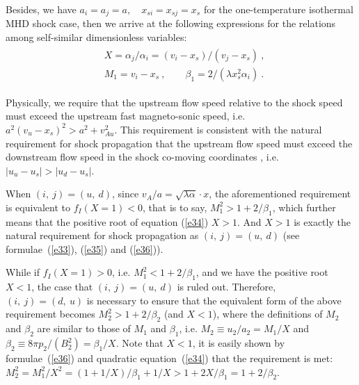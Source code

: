 \documentclass[fleqn,usenatbib]{mnras}
\begin{document}
Besides, we have $a_{i}=a_{j}=a, \quad x_{si}=x_{sj}=x_{s}$ for the one-temperature isothermal MHD shock case, then we arrive at the following expressions for the relations among self-similar dimensionless variables:
\begin{gather}
\begin{split}
&X=\alpha_{j}/\alpha_{i}=(v_{i}-x_{s})/(v_{j}-x_{s})\ ,\\
&M_{1}=v_{i}-x_{s}\ , \qquad \beta_{1}
 =2/(\lambda x^{2}_{s}\alpha_{i})\ .
\end{split}\label{e36}
\end{gather}

Physically, we require that the upstream flow speed relative to the shock speed must exceed the upstream fast magneto-sonic speed, i.e. $a^{2}(v_{u}-x_{s})^{2}>a^{2}+v^{2}_{Au}$. This requirement is consistent with the natural requirement for shock propagation that the upstream flow speed must exceed the downstream flow speed in the shock co-moving coordinates \citep{FM}, i.e. $|u_{u}-u_{s}|>|u_{d}-u_{s}|$.


When $(i,\ j)=(u,\ d)$, since $v_{A}/a=\sqrt{\lambda\alpha}\cdot x$, the aforementioned requirement is equivalent to $f_{I}(X=1)<0$, that is to say, $M_{1}^{2}>1+2/\beta_{1}$, which further means that the positive root of equation (\ref{e34}) $X>1$. And $X>1$ is exactly the natural requirement for shock propagation as $(i,\ j)=(u,\ d)$ (see formulae~(\ref{e33}), (\ref{e35}) and (\ref{e36})).

While if $f_{I}(X=1)>0$, i.e. $M_{1}^{2}<1+2/\beta_{1}$, and we have the positive root $X<1$, the case that $(i,\ j)=(u,\ d)$ is ruled out. Therefore, $(i,\ j)=(d,\ u)$ is necessary to ensure that the equivalent form of the above requirement becomes $M_{2}^{2}>1+2/\beta_{2}$ (and $X<1$), where the definitions of $M_{2}$ and $\beta_{2}$ are similar to those of $M_{1}$ and $\beta_{1}$, i.e. $M_{2}\equiv u_{2}/a_{2}=M_{1}/X$ and $\beta_{2}\equiv 8\pi p_{2}/\left(B_{2}^{2}\right)=\beta_{1}/X$. Note that $X<1$, it is easily shown by formulae~(\ref{e36}) and quadratic equation~(\ref{e34}) that the requirement is met: $M_{2}^{2}=M^{2}_{1}/X^{2}=(1+1/X)/\beta_{1}+1/X>1+2X/\beta_{1}=1+2/\beta_{2}$.


\end{document}
